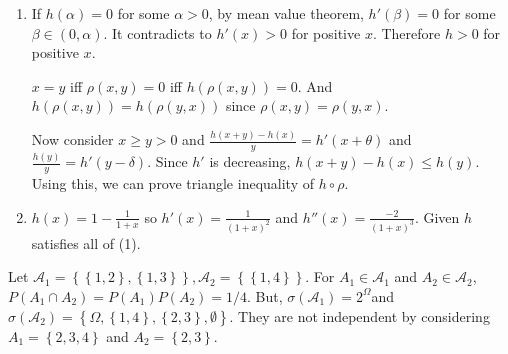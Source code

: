 \begin{problem}[2.1.3]\hfill

	\begin{enumerate}
		\item If $h(\alpha) = 0$ for some $\alpha >0$, by mean value theorem, $h'(\beta) = 0$ for some $\beta \in (0, \alpha)$. It contradicts to $h'(x) >0$ for positive $x$. Therefore $h >0$ for positive $x$. 

			$x = y$ iff $\rho(x, y) = 0$ iff $h(\rho(x, y)) = 0$. And $h(\rho(x, y)) = h(\rho(y, x))$ since $\rho(x, y) = \rho(y, x)$.

			Now consider $x \geq y > 0$ and $\frac{h(x+y) - h(x)}{y} = h'(x+\theta)$ and $\frac{h(y)}{y} = h'(y-\delta)$. Since $h'$ is decreasing, $h(x+y)-h(x) \leq h(y)$. Using this, we can prove triangle inequality of $h \circ \rho$. 

		\item $h(x) = 1-\frac{1}{1+x}$ so $h'(x) = \frac{1}{(1+x)^2}$ and $h''(x) = \frac{-2}{(1+x)^3}$. Given $h$ satisfies all of (1).
	\end{enumerate}
	
\end{problem}

\begin{problem}[2.1.9]\hfill
	
	Let $\mathcal{A}_1 = \left\{ \left\{ 1, 2 \right\}, \left\{ 1, 3 \right\} \right\}, \mathcal{A}_2 = \left\{ \left\{ 1, 4 \right\} \right\}$. For $A_1 \in \mathcal{A}_1$ and $A_2 \in \mathcal{A}_2$, $P(A_1 \cap A_2) = P(A_1)P(A_2) = 1/4$. But, $\sigma\left( \mathcal{A}_1 \right) = 2^{\Omega}$and $\sigma\left( \mathcal{A}_2 \right) = \left\{ \Omega, \left\{ 1, 4 \right\}, \left\{ 2, 3 \right\}, \emptyset \right\}$. They are not independent by considering $A_1 = \left\{ 2, 3, 4 \right\}$ and $A_2 = \left\{ 2, 3 \right\}$.
\end{problem}


